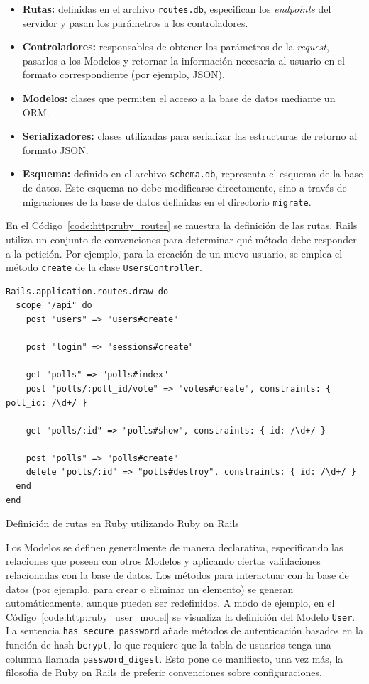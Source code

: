 \documentclass[11pt]{article}
\newcommand{\english}[1]{\textit{#1}}
\begin{document}
\begin{itemize}
    \item \textbf{Rutas:} definidas en el archivo \lstinline{routes.db}, especifican los \english{endpoints} del servidor y pasan los parámetros a los controladores.
    \item \textbf{Controladores:} responsables de obtener los parámetros de la \english{request}, pasarlos a los Modelos y retornar la información necesaria al usuario en el formato correspondiente (por ejemplo, JSON).
    \item \textbf{Modelos:} clases que permiten el acceso a la base de datos mediante un ORM.
    \item \textbf{Serializadores:} clases utilizadas para serializar las estructuras de retorno al formato JSON.
    \item \textbf{Esquema:} definido en el archivo \lstinline{schema.db}, representa el esquema de la base de datos. Este esquema no debe modificarse directamente, sino a través de migraciones de la base de datos definidas en el directorio \lstinline{migrate}.
\end{itemize}

En el Código~\ref{code:http:ruby_routes} se muestra la definición de las rutas. Rails utiliza un conjunto de convenciones para determinar qué método debe responder a la petición. Por ejemplo, para la creación de un nuevo usuario, se emplea el método \lstinline{create} de la clase \lstinline{UsersController}.

\begin{listing}
\begin{verbatim}
Rails.application.routes.draw do
  scope "/api" do
    post "users" => "users#create"

    post "login" => "sessions#create"

    get "polls" => "polls#index"
    post "polls/:poll_id/vote" => "votes#create", constraints: { poll_id: /\d+/ }

    get "polls/:id" => "polls#show", constraints: { id: /\d+/ }

    post "polls" => "polls#create"
    delete "polls/:id" => "polls#destroy", constraints: { id: /\d+/ }
  end
end
\end{verbatim}
\caption{Definición de rutas en Ruby utilizando Ruby on Rails}
\label{code:http:ruby_routes}
\end{listing}

Los Modelos se definen generalmente de manera declarativa, especificando las relaciones que poseen con otros Modelos y aplicando ciertas validaciones relacionadas con la base de datos. Los métodos para interactuar con la base de datos (por ejemplo, para crear o eliminar un elemento) se generan automáticamente, aunque pueden ser redefinidos. A modo de ejemplo, en el Código~\ref{code:http:ruby_user_model} se visualiza la definición del Modelo \lstinline{User}. La sentencia \lstinline{has_secure_password} añade métodos de autenticación basados en la función de hash \lstinline{bcrypt}, lo que requiere que la tabla de usuarios tenga una columna llamada \lstinline{password_digest}. Esto pone de manifiesto, una vez más, la filosofía de Ruby on Rails de preferir convenciones sobre configuraciones.
\end{document}
